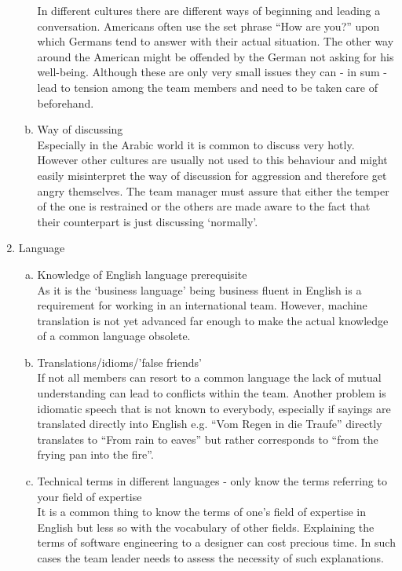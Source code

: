 \begin{multicols}{2}
\begin{enumerate}[1.]
\begin{enumerate}[a)]
			In different cultures there are different ways of beginning and leading a conversation. Americans often use the set phrase “How are you?” upon which Germans tend to answer with their actual situation. The other way around the American might be offended by the German not asking for his well-being. Although these are only very small issues they can - in sum - lead to tension among the team members and need to be taken care of beforehand.
		  	\item Way of discussing \\
			Especially in the Arabic world it is common to discuss very hotly. However other cultures are usually not used to this behaviour and might easily misinterpret the way of discussion for aggression and therefore get angry themselves. The team  manager must assure that either the temper of the one is restrained or the others are made aware to the fact that their counterpart is just discussing ‘normally’.
		\end{enumerate}
\item Language
		\begin{enumerate}[a)]
		  \item Knowledge of English language prerequisite \\
As it is the ‘business language’ being business fluent in English is a requirement for working in an international team. However, machine translation is not yet advanced far enough to make the actual knowledge of a common language obsolete. 
		  \item Translations/idioms/’false friends’\\
If not all members can resort to a common language the lack of mutual understanding can lead to conflicts within the team. Another problem is idiomatic speech that is not known to everybody, especially if sayings are translated directly into English e.g. “Vom Regen in die Traufe” directly translates to “From rain to eaves” but rather corresponds to “from the frying pan into the fire”.
		  \item Technical terms in different languages - only know the terms referring to your field of expertise \\
It is a common thing to know the terms of one’s field of expertise in English but less so with the vocabulary of other fields. Explaining the terms of software engineering to a designer can cost precious time. In such cases the team leader needs to assess the necessity of such explanations.
		\end{enumerate}
\end{enumerate}
\end{multicols}